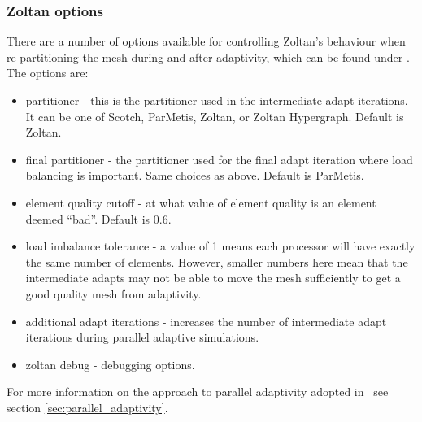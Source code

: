 \subsubsection{Zoltan options}
\label{sec:configuring_fluidity_zoltan_options}

There are a number of options available for controlling Zoltan's behaviour when re-partitioning the mesh during
and after adaptivity, which can be found under . The options are:
\begin{itemize}
\item partitioner - this is the partitioner used in the intermediate adapt iterations. It can be one of Scotch, ParMetis, Zoltan, or Zoltan Hypergraph. Default is Zoltan.
\item final partitioner - the partitioner used for the final adapt iteration where load balancing is important. Same choices as above. Default is ParMetis.
\item element quality cutoff - at what value of element quality is an element deemed ``bad''. Default is 0.6.
\item load imbalance tolerance - a value of 1 means each processor will have exactly the same number of elements. However, smaller numbers here mean that the intermediate adapts may
not be able to move the mesh sufficiently to get a good quality mesh from adaptivity.
\item additional adapt iterations - increases the number of intermediate adapt iterations during parallel adaptive simulations.
\item zoltan debug - debugging options.
\end{itemize}

For more information on the approach to parallel adaptivity adopted in \fluidity\ see section \ref{sec:parallel_adaptivity}.
